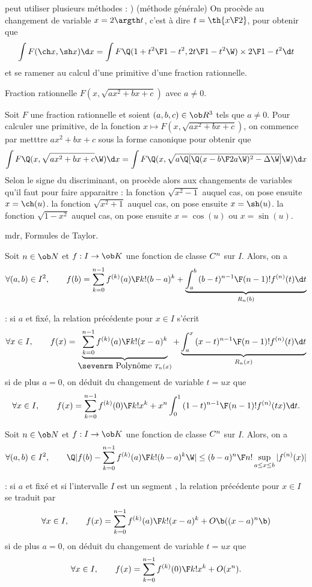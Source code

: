 peut utiliser plusieurs méthodes : ) (méthode générale) On procède au changement de variable $x=2\argth t$, c'est à dire $t=\th{x\F2}$, pour obtenir que 
$$
\int F(\ch x,\sh x)\d x=\int F\Q({1+t^2\F1-t^2},{2t\F 1-t^2}\W)\times{2\F1-t^2}\d t
$$
et se ramener au calcul d'une primitive d'une fraction rationnelle. 



\Concept [Index=Primitives!des fonctions du type@des fonctions du type $F(x, \sqrt{ax^2+bx+c})$]  Fraction rationnelle $F(x, \sqrt{ax^2+bx+c})$ avec $a\neq0$. 

\Propriete []  Soit $F$ une fraction rationnelle et soient $(a,b,c)\in\ob R^3$ tels que $a\neq0$. 
Pour calculer une primitive, de la fonction $x\mapsto F(x, \sqrt{ax^2+bx+c})$, on commence par metttre $ax^2+bx+c$ sous la forme canonique pour obtenir que 
$$
\int F\Q(x,\sqrt{ax^2+bx+c}\W)\d x=\int F\Q(x, \sqrt{a\Q[\Q(x-{b\F2a}\W)^2-\Delta\W]}\W)\d x
$$
Selon le signe du discriminant, on procède alors aux changements de variables qu'il faut pour faire apparaitre : \pn
la fonction $\sqrt{x^2-1}$ auquel cas, on pose ensuite $x=\ch(u)$. \pn
la fonction $\sqrt{x^2+1}$ auquel cas, on pose ensuite $x=\sh(u)$. \pn
la fonction $\sqrt{1-x^2}$ auquel cas, on pose ensuite $x=\cos(u)$ ou $x=\sin(u)$. 
\bigskip

\Section mdr, Formules de Taylor. 


\Theoreme [Title=Formule de Taylor]
Soit $n\in\ob N$ et $f:I\to\ob K$ une fonction de classe $\sc C^n$ sur $I$. Alors, on a 
$$
\forall(a,b)\in I^2, \qquad f(b)=\sum_{k=0}^{n-1}{f^{(k)}(a)\F k!}(b-a)^k+\underbrace{\int_a^b{(b-t)^{n-1}\F(n-1)!}f^{(n)}(t)\d t}_{R_n(b)}
$$

\Remarque : si $a$ et fixé, la relation précédente pour $x\in I$ s'écrit 
$$
\forall x\in I, \qquad f(x)=\underbrace{\sum_{k=0}^{n-1}{f^{(k)}(a)\F k!}(x-a)^k}_{\mbox{\sevenrm Polynôme }T_n(x)}+\underbrace{\int_a^x{(x-t)^{n-1}\F(n-1)!}f^{(n)}(t)\d t}_{R_n(x)}
$$
si de plus $a=0$, on déduit du changement de variable $t=ux$ que 
$$
\forall x\in I, \qquad f(x)=\sum_{k=0}^{n-1}{f^{(k)}(0)\F k!}x^k+x^n\int_0^1{(1-t)^{n-1}\F(n-1)!}f^{(n)}(tx)\d t.
$$
\bigskip


\Theoreme [Title=Inégalité de Taylor-Lagrange] 
Soit $n\in\ob N$ et $f:I\to\ob K$ une fonction de classe $\sc C^n$ sur $I$. Alors, on a 
$$
\forall(a,b)\in I^2, \qquad\Q|f(b)-\sum_{k=0}^{n-1}{f^{(k)}(a)\F k!}(b-a)^k\W|\le{(b-a)^n\F n!}\sup_{a\le x\le b}|f^{(n)}(x)|
$$

\Remarque : si $a$ et fixé et si l'intervalle $I$ est un segment , la relation précédente pour $x\in I$ se traduit par 
$$
\forall x\in I, \qquad f(x)=\sum_{k=0}^{n-1}{f^{(k)}(a)\F k!}(x-a)^k+O\b((x-a)^n\b)
$$
si de plus $a=0$, on déduit du changement de variable $t=ux$ que 
$$
\forall x\in I, \qquad f(x)=\sum_{k=0}^{n-1}{f^{(k)}(0)\F k!}x^k+O(x^n).
$$

